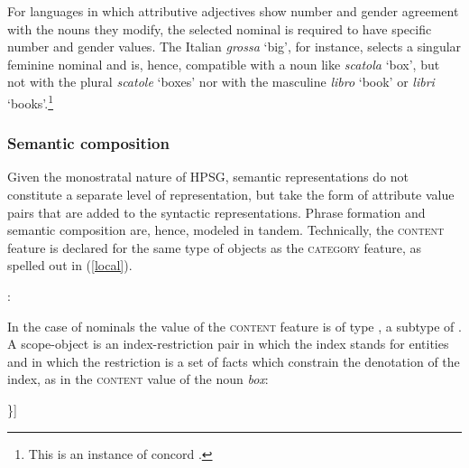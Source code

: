 \documentclass[output=paper
                ,modfonts
                ,nonflat
	        ,collection
	        ,collectionchapter
	        ,collectiontoclongg
 	        ,biblatex
                ,babelshorthands
                ,newtxmath
                ,draftmode
                ,colorlinks, citecolor=brown
]{./langsci/langscibook}
\begin{document}
For languages in which attributive adjectives show number and gender agreement 
with the nouns they modify, the selected nominal is required to have specific 
number and gender values. The Italian \emph{grossa} `big', for instance, 
selects a singular feminine nominal and is, hence, compatible with a noun like 
\emph{scatola} `box', but not with the plural \emph{scatole} `boxes' nor with 
the masculine \emph{libro} `book' or \emph{libri} `books'.\footnote{This is an 
instance of concord .}  


\subsubsection{Semantic composition}
\label{semco} 


Given the monostratal nature of HPSG, semantic representations 
do not constitute a separate level of representation, but take the form 
of attribute value pairs that are added to the syntactic representations.   
Phrase formation and semantic composition are, hence, modeled in tandem.  
Technically, the \textsc{content} feature is declared for the same type of objects 
as the \textsc{category} feature, as spelled out in (\ref{local}). 

\begin{exe} 
\ex\label{local}  : \begin{avm} 
                   \end{avm} 
\end{exe} 

\noindent 
In the case of nominals the value of the \textsc{content} feature is of 
type , a subtype of  \citep[122]{GS00}. 
A scope-object is an index-restriction pair in which the index stands for 
entities and in which the restriction is a set of facts which constrain the 
denotation of the index, as in the \textsc{content} value of the noun \emph{box}:    

\begin{exe} 
\ex\label{red} 
\begin{avm}
[\type{scope-object}   \\
 index @1 \type{index} \\
 restr \{[\type{box}   \\
            arg @1 ]\}]
\end{avm} 
\end{exe}
\end{document}
